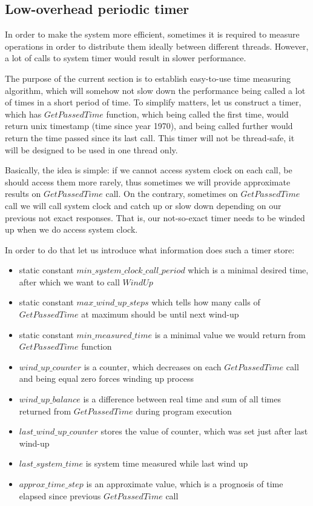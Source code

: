 \documentclass{article}
\begin{document}
\subsection{Low-overhead periodic timer}
\label{subsec:low_overhead_periodic_timer}

In order to make the system more efficient, sometimes it is required to measure operations in order to distribute them ideally between different threads. However, a lot of calls to system timer would result in slower performance.

The purpose of the current section is to establish easy-to-use time measuring algorithm, which will somehow not slow down the performance being called a lot of times in a short period of time. To simplify matters, let us construct a timer, which has $GetPassedTime$ function, which being called the first time, would return unix timestamp (time since year 1970), and being called further would return the time passed since its last call. This timer will not be thread-safe, it will be designed to be used in one thread only.

Basically, the idea is simple: if we cannot access system clock on each call, be should access them more rarely, thus sometimes we will provide approximate results on $GetPassedTime$ call. On the contrary, sometimes on $GetPassedTime$ call we will call system clock and catch up or slow down depending on our previous not exact responses. That is, our not-so-exact timer needs to be winded up when we do access system clock.

In order to do that let us introduce what information does such a timer store:
\begin{itemize}
	\item static constant $min\_system\_clock\_call\_period$ which is a minimal desired time, after which we want to call $WindUp$
	\item static constant $max\_wind\_up\_steps$ which tells how many calls of $GetPassedTime$ at maximum should be until next wind-up
	\item static constant $min\_measured\_time$ is a minimal value we would return from $GetPassedTime$ function
	\item $wind\_up\_counter$ is a counter, which decreases on each $GetPassedTime$ call and being equal zero forces winding up process
	\item $wind\_up\_balance$ is a difference between real time and sum of all times returned from $GetPassedTime$ during program execution
	\item $last\_wind\_up\_counter$ stores the value of counter, which was set just after last wind-up
	\item $last\_system\_time$ is system time measured while last wind up
	\item $approx\_time\_step$ is an approximate value, which is a prognosis of time elapsed since previous $GetPassedTime$ call
\end{itemize}
\end{document}
